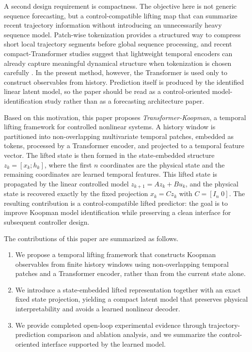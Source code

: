 \documentclass[journal]{IEEEtran}
\begin{document}
A second design requirement is compactness. The objective here is not generic sequence forecasting, but a control-compatible lifting map that can summarize recent trajectory information without introducing an unnecessarily heavy sequence model. Patch-wise tokenization provides a structured way to compress short local trajectory segments before global sequence processing, and recent compact-Transformer studies suggest that lightweight temporal encoders can already capture meaningful dynamical structure when tokenization is chosen carefully \cite{vaswani2017attention, nie2023time, zhou2022fedformer, liu2024itransformer, forootani2026compact, forootani2025synthetic}. In the present method, however, the Transformer is used only to construct observables from history. Prediction itself is produced by the identified linear latent model, so the paper should be read as a control-oriented model-identification study rather than as a forecasting architecture paper.

Based on this motivation, this paper proposes \emph{Transformer-Koopman}, a temporal lifting framework for controlled nonlinear systems. A history window is partitioned into non-overlapping multivariate temporal patches, embedded as tokens, processed by a Transformer encoder, and projected to a temporal feature vector. The lifted state is then formed in the state-embedded structure $z_k=[x_k;h_k]$, where the first $n$ coordinates are the physical state and the remaining coordinates are learned temporal features. This lifted state is propagated by the linear controlled model $z_{k+1}=Az_k+Bu_k$, and the physical state is recovered exactly by the fixed projection $x_k=Cz_k$ with $C=[I_n\;0]$. The resulting contribution is a control-compatible lifted predictor: the goal is to improve Koopman model identification while preserving a clean interface for subsequent controller design.

The contributions of this paper are summarized as follows.
\begin{enumerate}
    \item We propose a temporal lifting framework that constructs Koopman observables from finite history windows using non-overlapping temporal patches and a Transformer encoder, rather than from the current state alone.
    \item We introduce a state-embedded lifted representation together with an exact fixed state projection, yielding a compact latent model that preserves physical interpretability and avoids a learned nonlinear decoder.
    \item We provide completed open-loop experimental evidence through trajectory-prediction comparison and ablation analysis, and we summarize the control-oriented interface supported by the learned model.
\end{enumerate}
\end{document}
